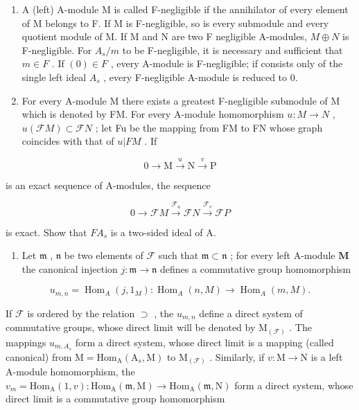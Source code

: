 \begin{enumerate}
\def\labelenumi{(\alph{enumi})}
\item
  A (left) A-module M is called F-negligible if the annihilator of every element of M belongs to F. If M is F-negligible, so is every submodule and every quotient module of M. If M and N are two F negligible A-modules, \(M \oplus N\) is F-negligible. For \(A_{s}/m\) to be F-negligible, it is necessary and sufficient that \(m \in F\) . If \((0) \in F\) , every A-module is F-negligible; if consists only of the single left ideal \(A_{s}\) , every F-negligible A-module is reduced to 0.
\item
  For every A-module M there exists a greatest F-negligible submodule of M which is denoted by FM. For every A-module homomorphism \(u: M \to N\) , \(u(\mathcal{F}M) \subset \mathcal{F}N\) ; let Fu be the mapping from FM to FN whose graph coincides with that of \(u|FM\) . If
\end{enumerate}

\[
0 \longrightarrow \mathrm{M} \stackrel {u} {\longrightarrow} \mathrm{N} \stackrel {v} {\longrightarrow} \mathrm{P}
\]

is an exact sequence of A-modules, the sequence

\[
0 \longrightarrow \mathcal {F} M \stackrel {\mathcal {F} _ {u}} {\longrightarrow} \mathcal {F} N \stackrel {\mathcal {F} _ {v}} {\longrightarrow} \mathcal {F} P
\]

is exact. Show that \(FA_{s}\) is a two-sided ideal of A.

\begin{enumerate}
\def\labelenumi{(\alph{enumi})}
\setcounter{enumi}{2}
\tightlist
\item
  Let \(\mathfrak{m}\) , \(\mathfrak{n}\) be two elements of \(\mathcal{F}\) such that \(\mathfrak{m} \subset \mathfrak{n}\) ; for every left A-module \(\mathbf{M}\) the canonical injection \(j \colon \mathfrak{m} \to \mathfrak{n}\) defines a commutative group homomorphism
\end{enumerate}

\[
u _ {m, n} = \operatorname{Hom} _ {A} (j, 1 _ {M}): \operatorname{Hom} _ {A} (n, M) \rightarrow \operatorname{Hom} _ {A} (m, M).
\]

If \(\mathcal{F}\) is ordered by the relation \(\supset\) , the \(u_{m,n}\) define a direct system of commutative groups, whose direct limit will be denoted by \(\mathrm{M}_{(\mathcal{F})}\) . The mappings \(u_{m,A_s}\) form a direct system, whose direct limit is a mapping (called canonical) from \(\mathrm{M} = \mathrm{Hom}_{\mathrm{A}}(\mathrm{A}_s,\mathrm{M})\) to \(\mathrm{M}_{(\mathcal{F})}\) . Similarly, if \(v: \mathrm{M} \to \mathrm{N}\) is a left A-module homomorphism, the \(v_m = \mathrm{Hom}_{\mathrm{A}}(1,v): \mathrm{Hom}_{\mathrm{A}}(\mathfrak{m},\mathrm{M}) \to \mathrm{Hom}_{\mathrm{A}}(\mathfrak{m},\mathrm{N})\) form a direct system, whose direct limit is a commutative group homomorphism

